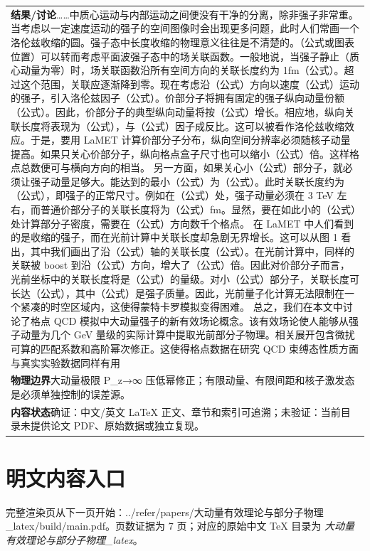 \documentclass[UTF8,11pt,oneside]{ctexbook}
\begin{document}
\begin{table}[htbp]
\begin{tabular}{@{}p{}@{}}
    \textbf{结果/讨论}\quad ……中质心运动与内部运动之间便没有干净的分离，除非强子非常重。当考虑以一定速度运动的强子的空间图像时会出现更多问题，此时人们常画一个洛伦兹收缩的圆。强子态中长度收缩的物理意义往往是不清楚的。（公式或图表位置）可以转而考虑平面波强子态中的场关联函数。一般地说，当强子静止（质心动量为零）时，场关联函数沿所有空间方向的关联长度约为 1fm（公式）。超过这个范围，关联应逐渐降到零。现在考虑沿（公式）方向以速度（公式）运动的强子，引入洛伦兹因子（公式）。价部分子将拥有固定的强子纵向动量份额（公式）。因此，价部分子的典型纵向动量将按（公式）增长。相应地，纵向关联长度将表现为（公式），与（公式）因子成反比。这可以被看作洛伦兹收缩效应。于是，要用 LaMET 计算价部分子分布，纵向空间分辨率必须随核子动量提高。如果只关心价部分子，纵向格点盒子尺寸也可以缩小（公式）倍。这样格点总数便可与横向方向的相当。 另一方面，如果关心小（公式）部分子，就必须让强子动量足够大。能达到的最小（公式）为（公式）。此时关联长度约为（公式），即强子的正常尺寸。例如在（公式）处，强子动量必须在 3 TeV 左右，而普通价部分子的关联长度将为（公式）fm。显然，要在如此小的（公式）处计算部分子密度，需要在（公式）方向数千个格点。 在 LaMET 中人们看到的是收缩的强子，而在光前计算中关联长度却急剧无界增长。这可以从图 1 看出，其中我们画出了沿（公式）轴的关联长度（公式）。在光前计算中，同样的关联被 boost 到沿（公式）方向，增大了（公式）倍。因此对价部分子而言，光前坐标中的关联长度将是（公式）的量级。对小（公式）部分子，关联长度可长达（公式），其中（公式）是强子质量。因此，光前量子化计算无法限制在一个紧凑的时空区域内，这使得蒙特卡罗模拟变得困难。 总之，我们在本文中讨论了格点 QCD 模拟中大动量强子的新有效场论概念。该有效场论使人能够从强子动量为几个 GeV 量级的实际计算中提取光前部分子物理。相关展开包含微扰可算的匹配系数和高阶幂次修正。这使得格点数据在研究 QCD 束缚态性质方面与真实实验数据同样有用 \\
    \textbf{物理边界}\quad 大动量极限 P\_z→∞ 压低幂修正；有限动量、有限间距和核子激发态是必须单独控制的误差源。 \\
    \textbf{内容状态}\quad 确证：中文/英文 LaTeX 正文、章节和索引可追溯；未验证：当前目录未提供论文 PDF、原始数据或独立复现。 \\
    \bottomrule
  \end{tabular}
\end{table}
\section*{明文内容入口}
\noindent 完整渲染页从下一页开始：../\allowbreak{}refer/\allowbreak{}papers/\allowbreak{}大动量有效理论与部分子物理\_\allowbreak{}latex/\allowbreak{}build/\allowbreak{}main.pdf。页数证据为 7 页；对应的原始中文 TeX 目录为 \emph{大动量有效理论与部分子物理\_latex}。
\clearpage

\clearpage
\end{document}
